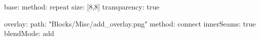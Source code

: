 base:
  method: repeat
  size: [8,8]
  transparency: true

overlay:
  path: "Blocks/Misc/add_overlay.png"
  method: connect
  innerSeams: true
  blendMode: add